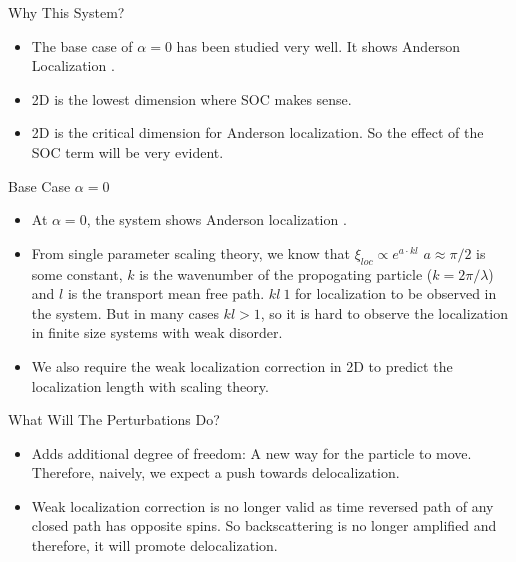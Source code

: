 \documentclass[]{beamer}
\begin{document}
\begin{frame}{Why This System?}
    \begin{itemize}
        \item The base case of $\alpha = 0$ has been studied very well. It shows Anderson Localization \cite{abrahamsScalingTheoryLocalization1979}.
        \pause
        \item 2D is the lowest dimension where SOC makes sense.
        \pause
        \item 2D is the critical dimension for Anderson
        localization. So the effect of the SOC term will be
        very evident.
    \end{itemize}
\end{frame}

\begin{frame}{Base Case \texorpdfstring{$\alpha = 0$}{α = 0}}
    \begin{itemize}
        \item At $\alpha = 0$, the system shows Anderson localization \cite{abrahamsScalingTheoryLocalization1979}.
        \item From single parameter scaling theory, we know
        that $\xi_{loc} \propto e^{a \cdot kl}$ $a \approx
        \pi/2$ is some constant, $k$ is the wavenumber of
        the propogating particle ($k=2\pi/\lambda$) and $l$
        is the transport mean free path. $kl ~ 1$ for
        localization to be observed in the system. But in
        many cases $kl > 1$, so it is hard to observe the
        localization in finite size systems with weak
        disorder.
        \item We also require the weak localization
        correction in 2D to predict the localization length
        with scaling theory.
    \end{itemize}
\end{frame}

\begin{frame}{What Will The Perturbations Do?}
    \begin{itemize}
        \item Adds additional degree of freedom: A new way
        for the particle to move. Therefore, naively, we
        expect a push towards delocalization.
        \item Weak localization correction is no longer
        valid as time reversed path of any closed path has
        opposite spins. So backscattering is no longer
        amplified and therefore, it will promote
        delocalization.
    \end{itemize}
\end{frame}
\end{document}
